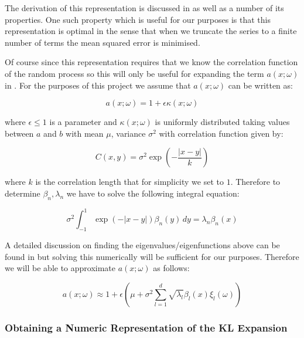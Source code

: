 The derivation of this representation is discussed in \cite{stochastic-fem} as
well as a number of its properties. One such property which is useful for our
purposes is that this representation is optimal in the sense that when we
truncate the series to a finite number of terms the mean squared error is
minimised.

Of course since this representation requires that we know the correlation
function of the random process so this will only be useful for expanding the
term $a(x;\omega)$ in .  For the purposes of this
project we assume that $a(x;\omega)$ can be written as:

\begin{equation}
    a(x;\omega) = 1 + \epsilon\kappa(x;\omega)
\end{equation}

where $\epsilon \leq 1$ is a parameter and  $\kappa(x;\omega)$ is
uniformly distributed taking values between $a$ and $b$ with mean $\mu$,
variance $\sigma^2$ with correlation function given by:

\begin{equation}
    C(x, y) = \sigma^2\exp\left(-\frac{|x - y|}{k}\right)
\end{equation}

where $k$ is the correlation length that for simplicity we set to $1$.
Therefore to determine $\beta_n, \lambda_n$ we have to solve the following
integral equation:

\begin{equation}\label{eq:oned-stochastic-kle-eigenvalue-problem}
    \sigma^2\int_{-1}^1\exp(-|x - y|)\beta_n(y)\, dy = \lambda_n\beta_n(x)
\end{equation}

A detailed discussion on finding the eigenvalues/eigenfunctions above can be
found in \cite{stochastic-fem} but solving this numerically will be sufficient
for our purposes. Therefore we will be able to approximate $a(x;\omega)$
as follows:

\begin{equation}\label{eq:oned-stochastic-kl-kappa}
    a(x;\omega) \approx 1 + \epsilon\left(
        \mu + \sigma^2\sum_{l=1}^d\sqrt{\lambda_l}\beta_l(x)\xi_l(\omega)
    \right)
\end{equation}

\subsubsection{Obtaining a Numeric Representation of the KL Expansion}

